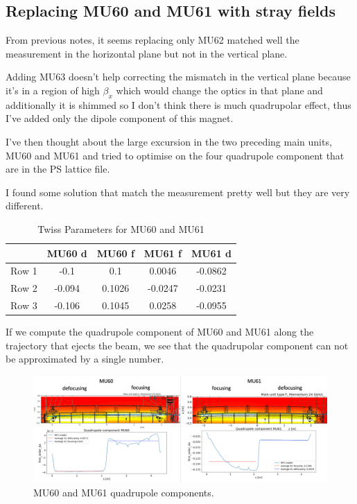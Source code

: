 \subsection{Replacing MU60 and MU61 with stray fields}

From previous notes, it seems replacing only MU62 matched well the measurement in the horizontal plane but not in the vertical plane.

Adding MU63 doesn't help correcting the mismatch in the vertical plane because it's in a region of high $\beta_{x}$ which would change the optics in that plane and additionally it is shimmed so I don't think there is much quadrupolar effect, thus I've added only the dipole component of this magnet.

I've then thought about the large excursion in the two preceding main units, MU60 and MU61 and tried to optimise on the four quadrupole component that are in the PS lattice file.

I found some solution that match the measurement pretty well but they are very different.

\begin{table}[ht]
    \centering
    \caption{Twiss Parameters for MU60 and MU61}
    \begin{tabular}{l c c c c}
        \hline
        & \textbf{MU60 d} & \textbf{MU60 f} & \textbf{MU61 f} & \textbf{MU61 d} \\
        \hline
        Row 1 & -0.1 & 0.1 & 0.0046 & -0.0862 \\
        Row 2 & -0.094 & 0.1026 & -0.0247 & -0.0231 \\
        Row 3 & -0.106 & 0.1045 & 0.0258 & -0.0955 \\
        \hline
    \end{tabular}
    \label{tab:twiss_parameters_mu60_mu61}
\end{table}



If we compute the quadrupole component of MU60 and MU61 along the trajectory that ejects the beam, we see that the quadrupolar component can not be approximated by a single number.

\begin{figure}[H]
\centering
\includegraphics[width=1.0\textwidth]{02_Simulation/images/mu60_mu61_quad_comp.png}
\caption{MU60 and MU61 quadrupole components.}
\label{fig:mu60_mu61_q_comp}
\end{figure}

